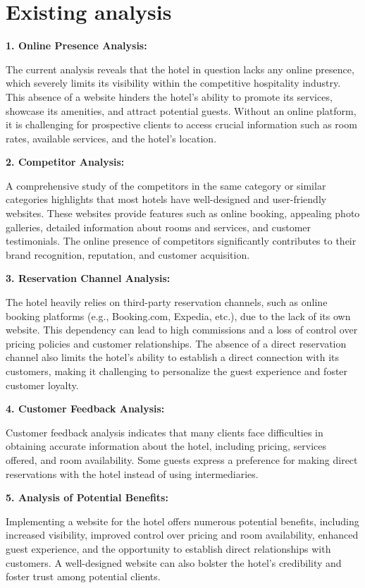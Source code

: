 \section{Existing analysis }

\textbf{1. Online Presence Analysis:}

The current analysis reveals that the hotel in question lacks any online presence, which severely limits its visibility within the competitive hospitality industry. This absence of a website hinders the hotel's ability to promote its services, showcase its amenities, and attract potential guests. Without an online platform, it is challenging for prospective clients to access crucial information such as room rates, available services, and the hotel's location.

\textbf{2. Competitor Analysis:}

A comprehensive study of the competitors in the same category or similar categories highlights that most hotels have well-designed and user-friendly websites. These websites provide features such as online booking, appealing photo galleries, detailed information about rooms and services, and customer testimonials. The online presence of competitors significantly contributes to their brand recognition, reputation, and customer acquisition.

\textbf{3. Reservation Channel Analysis:}

The hotel heavily relies on third-party reservation channels, such as online booking platforms (e.g., Booking.com, Expedia, etc.), due to the lack of its own website. This dependency can lead to high commissions and a loss of control over pricing policies and customer relationships. The absence of a direct reservation channel also limits the hotel's ability to establish a direct connection with its customers, making it challenging to personalize the guest experience and foster customer loyalty.

\textbf{4. Customer Feedback Analysis:}

Customer feedback analysis indicates that many clients face difficulties in obtaining accurate information about the hotel, including pricing, services offered, and room availability. Some guests express a preference for making direct reservations with the hotel instead of using intermediaries.

\textbf{5. Analysis of Potential Benefits:}

Implementing a website for the hotel offers numerous potential benefits, including increased visibility, improved control over pricing and room availability, enhanced guest experience, and the opportunity to establish direct relationships with customers. A well-designed website can also bolster the hotel's credibility and foster trust among potential clients.

